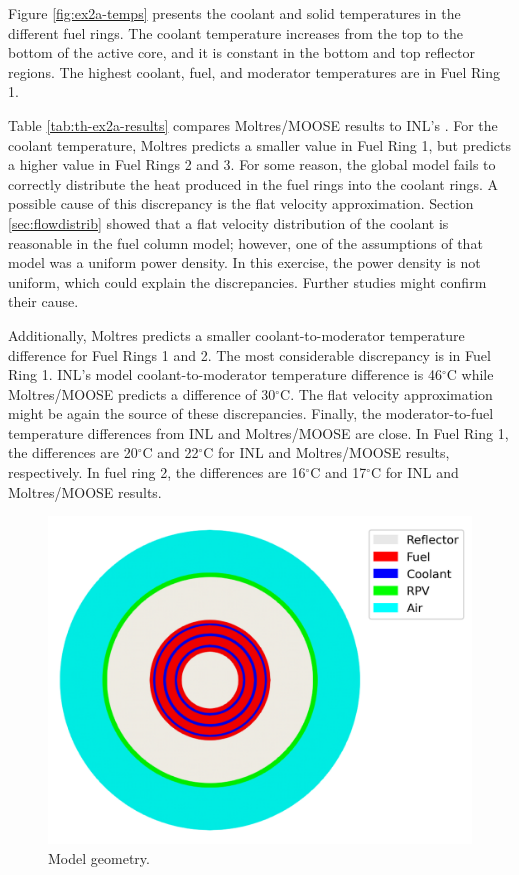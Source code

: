 Figure \ref{fig:ex2a-temps} presents the coolant and solid temperatures in the different fuel rings.
The coolant temperature increases from the top to the bottom of the active core, and it is constant in the bottom and top reflector regions.
The highest coolant, fuel, and moderator temperatures are in Fuel Ring 1.

Table \ref{tab:th-ex2a-results} compares Moltres/MOOSE results to INL's \cite{strydom_inl_2013}.
For the coolant temperature, Moltres predicts a smaller value in Fuel Ring 1, but predicts a higher value in Fuel Rings 2 and 3.
For some reason, the global model fails to correctly distribute the heat produced in the fuel rings into the coolant rings.
A possible cause of this discrepancy is the flat velocity approximation.
Section \ref{sec:flowdistrib} showed that a flat velocity distribution of the coolant is reasonable in the fuel column model; however, one of the assumptions of that model was a uniform power density.
In this exercise, the power density is not uniform, which could explain the discrepancies.
Further studies might confirm their cause.

Additionally, Moltres predicts a smaller coolant-to-moderator temperature difference for Fuel Rings 1 and 2.
The most considerable discrepancy is in Fuel Ring 1.
INL's model coolant-to-moderator temperature difference is 46$^{\circ}$C while Moltres/MOOSE predicts a difference of 30$^{\circ}$C.
The flat velocity approximation might be again the source of these discrepancies.
Finally, the moderator-to-fuel temperature differences from INL and Moltres/MOOSE are close.
In Fuel Ring 1, the differences are 20$^{\circ}$C and 22$^{\circ}$C for INL and Moltres/MOOSE results, respectively.
In fuel ring 2, the differences are 16$^{\circ}$C and 17$^{\circ}$C for INL and Moltres/MOOSE results.

\begin{figure}[htbp!]
  \centering
  \includegraphics[width=0.4\linewidth]{figures-thermal/ex2a-meshC2}
  \hfill
  \caption{Model geometry.}
  \label{fig:ex2a-2nd-model}
\end{figure}

